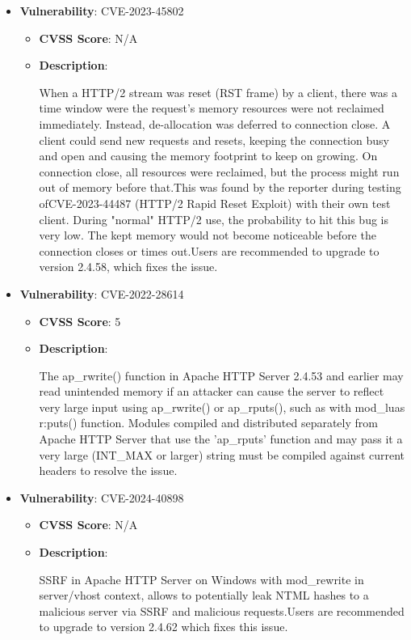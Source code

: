 \documentclass{article}
\begin{document}
\begin{itemize}
        \item \textbf{Vulnerability}: CVE-2023-45802
        \begin{itemize}
            \item \textbf{CVSS Score}:  N/A 
            \item \textbf{Description}:
            \parbox[t]{0.9\linewidth}{
                \ttfamily When a HTTP/2 stream was reset (RST frame) by a client, there was a time window were the request's memory resources were not reclaimed immediately. Instead, de-allocation was deferred to connection close. A client could send new requests and resets, keeping the connection busy and open and causing the memory footprint to keep on growing. On connection close, all resources were reclaimed, but the process might run out of memory before that.This was found by the reporter during testing ofCVE-2023-44487 (HTTP/2 Rapid Reset Exploit) with their own test client. During "normal" HTTP/2 use, the probability to hit this bug is very low. The kept memory would not become noticeable before the connection closes or times out.Users are recommended to upgrade to version 2.4.58, which fixes the issue.
            }
        \end{itemize}
    
        \item \textbf{Vulnerability}: CVE-2022-28614
        \begin{itemize}
            \item \textbf{CVSS Score}:  5 
            \item \textbf{Description}:
            \parbox[t]{0.9\linewidth}{
                \ttfamily The ap\_rwrite() function in Apache HTTP Server 2.4.53 and earlier may read unintended memory if an attacker can cause the server to reflect very large input using ap\_rwrite() or ap\_rputs(), such as with mod\_luas r:puts() function. Modules compiled and distributed separately from Apache HTTP Server that use the 'ap\_rputs' function and may pass it a very large (INT\_MAX or larger) string must be compiled against current headers to resolve the issue.
            }
        \end{itemize}
    
        \item \textbf{Vulnerability}: CVE-2024-40898
        \begin{itemize}
            \item \textbf{CVSS Score}:  N/A 
            \item \textbf{Description}:
            \parbox[t]{0.9\linewidth}{
                \ttfamily SSRF in Apache HTTP Server on Windows with mod\_rewrite in server/vhost context, allows to potentially leak NTML hashes to a malicious server via SSRF and malicious requests.Users are recommended to upgrade to version 2.4.62 which fixes this issue.
            }
        \end{itemize}
    

\end{itemize}
\end{document}
